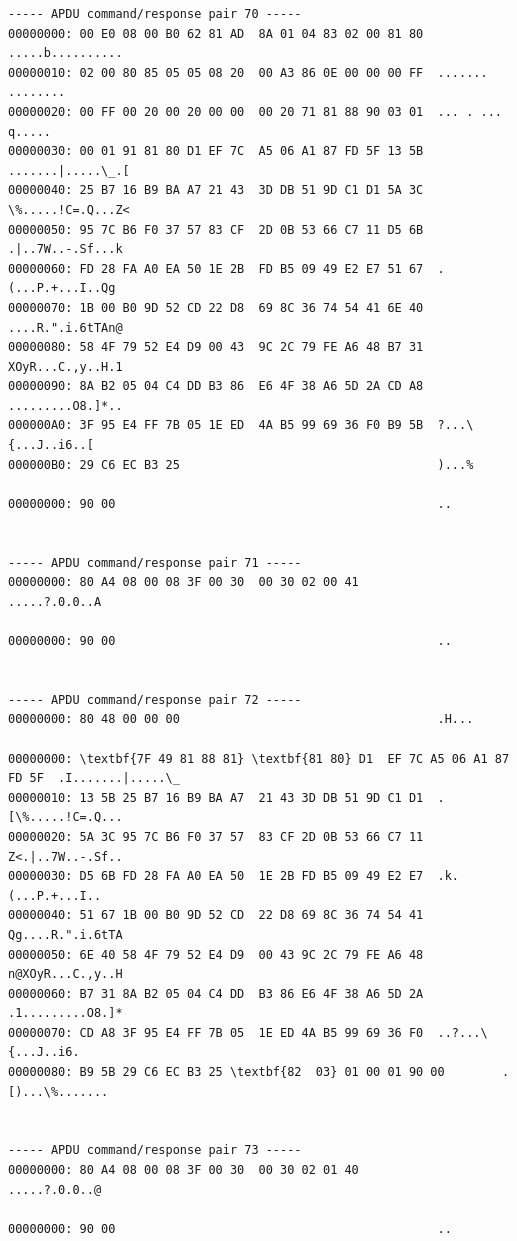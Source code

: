 \documentclass[bsc,frontabs,twoside,singlespacing,parskip,deptreport]{infthesis}     %
\begin{document}
\begin{appendices}
\begin{Verbatim}[commandchars=\\\{\}, fontsize=\small]
----- APDU command/response pair 70 -----
00000000: 00 E0 08 00 B0 62 81 AD  8A 01 04 83 02 00 81 80  .....b..........
00000010: 02 00 80 85 05 05 08 20  00 A3 86 0E 00 00 00 FF  ....... ........
00000020: 00 FF 00 20 00 20 00 00  00 20 71 81 88 90 03 01  ... . ... q.....
00000030: 00 01 91 81 80 D1 EF 7C  A5 06 A1 87 FD 5F 13 5B  .......|.....\_.[
00000040: 25 B7 16 B9 BA A7 21 43  3D DB 51 9D C1 D1 5A 3C  \%.....!C=.Q...Z<
00000050: 95 7C B6 F0 37 57 83 CF  2D 0B 53 66 C7 11 D5 6B  .|..7W..-.Sf...k
00000060: FD 28 FA A0 EA 50 1E 2B  FD B5 09 49 E2 E7 51 67  .(...P.+...I..Qg
00000070: 1B 00 B0 9D 52 CD 22 D8  69 8C 36 74 54 41 6E 40  ....R.".i.6tTAn@
00000080: 58 4F 79 52 E4 D9 00 43  9C 2C 79 FE A6 48 B7 31  XOyR...C.,y..H.1
00000090: 8A B2 05 04 C4 DD B3 86  E6 4F 38 A6 5D 2A CD A8  .........O8.]*..
000000A0: 3F 95 E4 FF 7B 05 1E ED  4A B5 99 69 36 F0 B9 5B  ?...\{...J..i6..[
000000B0: 29 C6 EC B3 25                                    )...%

00000000: 90 00                                             ..


----- APDU command/response pair 71 -----
00000000: 80 A4 08 00 08 3F 00 30  00 30 02 00 41           .....?.0.0..A

00000000: 90 00                                             ..


----- APDU command/response pair 72 -----
00000000: 80 48 00 00 00                                    .H...

00000000: \textbf{7F 49 81 88 81} \textbf{81 80} D1  EF 7C A5 06 A1 87 FD 5F  .I.......|.....\_
00000010: 13 5B 25 B7 16 B9 BA A7  21 43 3D DB 51 9D C1 D1  .[\%.....!C=.Q...
00000020: 5A 3C 95 7C B6 F0 37 57  83 CF 2D 0B 53 66 C7 11  Z<.|..7W..-.Sf..
00000030: D5 6B FD 28 FA A0 EA 50  1E 2B FD B5 09 49 E2 E7  .k.(...P.+...I..
00000040: 51 67 1B 00 B0 9D 52 CD  22 D8 69 8C 36 74 54 41  Qg....R.".i.6tTA
00000050: 6E 40 58 4F 79 52 E4 D9  00 43 9C 2C 79 FE A6 48  n@XOyR...C.,y..H
00000060: B7 31 8A B2 05 04 C4 DD  B3 86 E6 4F 38 A6 5D 2A  .1.........O8.]*
00000070: CD A8 3F 95 E4 FF 7B 05  1E ED 4A B5 99 69 36 F0  ..?...\{...J..i6.
00000080: B9 5B 29 C6 EC B3 25 \textbf{82  03} 01 00 01 90 00        .[)...\%.......


----- APDU command/response pair 73 -----
00000000: 80 A4 08 00 08 3F 00 30  00 30 02 01 40           .....?.0.0..@

00000000: 90 00                                             ..



\end{Verbatim}
\end{appendices}
\end{document}
